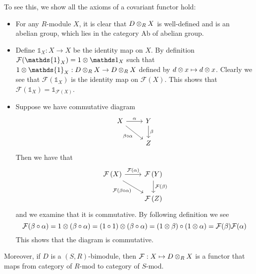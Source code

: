 To see this, we show all the axioms of a covariant functor hold:
\begin{itemize}
    \item For any $R$-module $X$, it is clear that $D\otimes_R X$ is well-defined and is an abelian group, which lies in the category Ab of abelian group.
    \item  Define $\mathds{1}_X:X\to X$ be the identity map on $X$. By definition $\mathcal F (\mathds{1}_X) = 1\ten \mathds 1_X$ such that $1\ten \mathds{1}_X:D\ten_R X \to D\ten_R X$ defined by $d\otimes x \mapsto d\otimes x$. Clearly we see that $\mathcal F (\mathds{1}_X)$ is the identity map on $\mathcal F(X)$. This shows that $\mathcal F(\mathds 1_X) = \mathds 1_{\mathcal F(X)}$.
    \item Suppose we have commutative diagram
        \[\begin{tikzcd}[sep=small]
	        X && Y \\
	        \\
	        && Z
	        \arrow["\alpha", from=1-1, to=1-3]
	        \arrow["{\beta\circ \alpha}"', from=1-1, to=3-3]
	        \arrow["\beta", from=1-3, to=3-3]
        \end{tikzcd}\]
        Then we have that 
        \[\begin{tikzcd}[sep=small]
	        \mathcal F\br{X} && \mathcal F \br{Y} \\
	        \\
	        && \mathcal F \br{Z}
	        \arrow["\mathcal F (\alpha)", from=1-1, to=1-3]
	        \arrow["\mathcal F \br{\beta\circ \alpha}"', from=1-1, to=3-3]
	        \arrow["\mathcal F\br{\beta}", from=1-3, to=3-3]
        \end{tikzcd}\]
        and we examine that it is commutative. By following definition we see 
        \[\mathcal F(\beta\circ \alpha) = 1\otimes(\beta\circ \alpha) = (1\circ 1)\otimes (\beta\circ \alpha) = (1\otimes \beta) \circ (1\otimes \alpha) = \mathcal F(\beta)\mathcal F(\alpha)\]
        This shows that the diagram is commutative.
\end{itemize}

Moreover, if $D$ is a $(S,R)$-bimodule, then $\mathcal F:X\mapsto D\otimes_R X$ is a functor that maps from category of $R$-mod to category of $S$-mod.

\medskip

